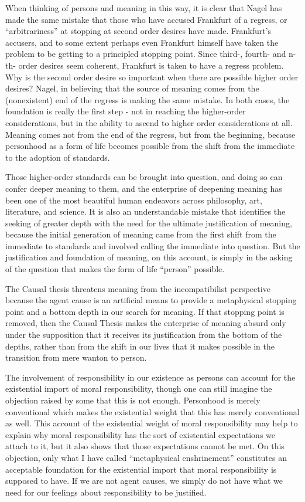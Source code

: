 \documentclass[phd,12pt,oneside,paper=letterpaper]{ubcthesis}
\begin{document}
When thinking of persons and meaning in this way, it is clear that Nagel has made the same mistake that those who have accused Frankfurt of a regress, or ``arbitrariness'' at stopping at second order desires have made. Frankfurt's accusers, and to some extent perhaps even Frankfurt himself have taken the problem to be getting to a principled stopping point. Since third-, fourth- and n-th- order desires seem coherent, Frankfurt is taken to have a regress problem. Why is the second order desire so important when there are possible higher order desires? Nagel, in believing that the source of meaning comes from the (nonexistent) end of the regress is making the same mistake. In both cases, the foundation is really the first step - not in reaching the higher-order considerations, but in the ability to ascend to higher order considerations at all. Meaning comes not from the end of the regress, but from the beginning, because personhood as a form of life becomes possible from the shift from the immediate to the adoption of standards.

Those higher-order standards can be brought into question, and doing so can confer deeper meaning to them, and the enterprise of deepening meaning has been one of the most beautiful human endeavors across philosophy, art, literature, and science. It is also an understandable mistake that identifies the seeking of greater depth with the need for the ultimate justification of meaning, because the initial generation of meaning came from the first shift from the immediate to standards and involved calling the immediate into question. But the justification and foundation of meaning, on this account, is simply in the asking of the question that makes the form of life ``person'' possible. 

The Causal thesis threatens meaning from the incompatibilist perspective because the agent cause is an artificial means to provide a metaphysical stopping point and a bottom depth in our search for meaning. If that stopping point is removed, then the Causal Thesis makes the enterprise of meaning absurd only under the supposition that it receives its justification from the bottom of the depths, rather than from the shift in our lives that it makes possible in the transition from mere wanton to person. 

The involvement of responsibility in our existence as persons can account for the existential import of moral responsibility, though one can still imagine the objection raised by some that this is not enough. Personhood is merely conventional which makes the existential weight that this has merely conventional as well. This account of the existential weight of moral responsibility may help to explain why moral responsibility has the sort of existential expectations we attach to it, but it also shows that those expectations cannot be met. On this objection, only what I have called ``metaphysical enshrinement'' constitutes an acceptable foundation for the existential import that moral responsibility is supposed to have. If we are not agent causes, we simply do not have what we need for our feelings about responsibility to be justified.
\end{document}
